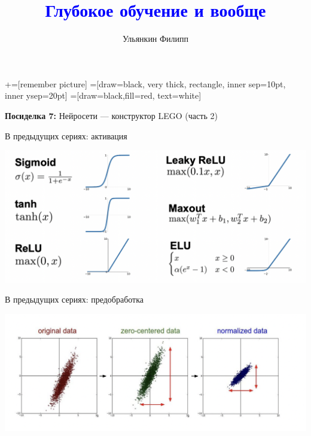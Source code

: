 \documentclass[notes,12pt, aspectratio=169]{beamer}
\title[]{\textcolor{blue}{Глубокое обучение и вообще}}
\author{Ульянкин Филипп}
\date{ }
\begin{document}
\newcommand\marktopleft[1]{%
    \tikz[overlay,remember picture] 
        \node (marker-#1-a) at (-.3em,.3em) {};%
}
\newcommand\markbottomright[2]{%
    \tikz[overlay,remember picture] 
        \node (marker-#1-b) at (0em,0em) {};%
}
+=[remember picture] 
 =[draw=black, very thick, rectangle, inner sep=10pt, inner ysep=20pt]
 =[draw=black,fill=red, text=white]



\begin{frame}
\maketitle
\centering \textbf{\color{blue} Посиделка 7:}  Нейросети — конструктор LEGO (часть 2)
\end{frame}



\begin{frame}{В предыдущих сериях: активация} 
	\begin{center}
		\includegraphics[width=.95\linewidth]{prev_activation.png}
	\end{center}
\end{frame}



\begin{frame}{В предыдущих сериях: предобработка} 
	\begin{center}
		\includegraphics[width=.9\linewidth]{prev_prep.png}
	\end{center}
\end{frame}
\end{document}
